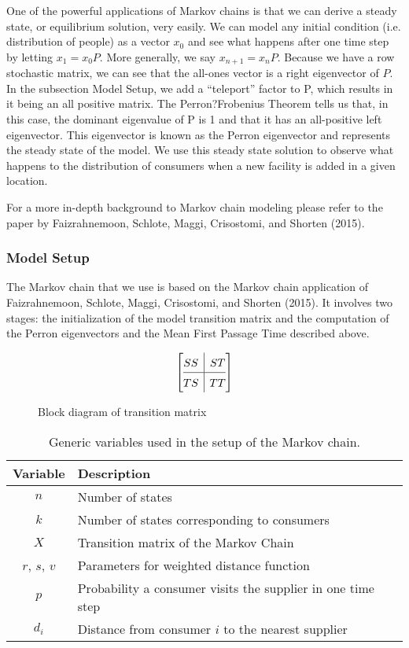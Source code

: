 \documentclass[twoside,twocolumn]{article}
\begin{document}
One of the powerful applications of Markov chains is that we can derive a steady state, or equilibrium solution, very easily.
We can model any initial condition (i.e. distribution of people) as a vector $x_0$ and see what happens after one time step by letting $x_1 = x_0 P$.
More generally, we say $x_{n + 1} = x_n P$.
Because we have a row stochastic matrix, we can see that the all-ones vector is a right eigenvector of $P$.
In the subsection Model Setup, we add a ``teleport'' factor to P, which results in it being an all positive matrix.
The Perron?Frobenius Theorem tells us that, in this case, the dominant eigenvalue of P is 1 and that it has an all-positive left eigenvector.
This eigenvector is known as the Perron eigenvector and represents the steady state of the model. %
We use this steady state solution to observe what happens to the distribution of consumers when a new facility is added in a given location.

For a more in-depth background to Markov chain modeling please refer to the paper by Faizrahnemoon, Schlote, Maggi, Crisostomi, and Shorten (2015).


\subsubsection{Model Setup}

The Markov chain that we use is based on the Markov chain application of Faizrahnemoon, Schlote, Maggi, Crisostomi, and Shorten (2015).
It involves two stages: the initialization of the model transition matrix and the computation of the Perron eigenvectors and the Mean First Passage Time described above.
\begin{figure}
\[
\renewcommand{\arraystretch}{1.5} %
\left[\begin{array}{@{}c|c@{}}
  SS &
  ST
\\ \hline
  TS
  & TT
\end{array}\right]
\]
\caption{Block diagram of transition matrix}
\end{figure}

\begin{table}
\begin{tabular}{c | p{5cm}}
Variable & Description\\
\hline
$n$ & Number of states\\
$k$ & Number of states corresponding to consumers\\
$X$ & Transition matrix of the Markov Chain\\
$r$, $s$, $v$ & Parameters for weighted distance function\\
$p$ & Probability a consumer visits the supplier in one time step\\
$d_{i}$ & Distance from consumer $i$ to the nearest supplier\\
\end{tabular}
\caption{Generic variables used in the setup of the Markov chain.}
\end{table}
\end{document}

